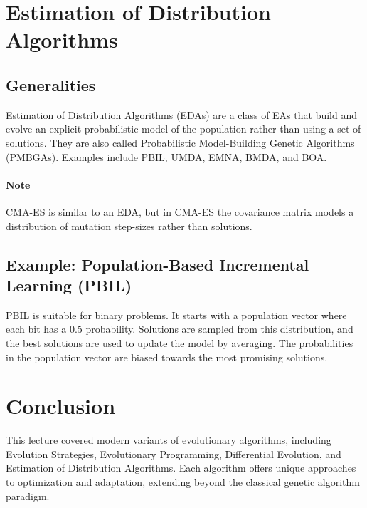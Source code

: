 \section{Estimation of Distribution Algorithms}
\subsection*{Generalities}
Estimation of Distribution Algorithms (EDAs) are a class of EAs that build and evolve an explicit probabilistic model of the population rather than using a set of solutions. They are also called Probabilistic Model-Building Genetic Algorithms (PMBGAs). Examples include PBIL, UMDA, EMNA, BMDA, and BOA.
\paragraph*{Note} CMA-ES is similar to an EDA, but in CMA-ES the covariance matrix models a distribution of mutation step-sizes rather than solutions.

\subsection*{Example: Population-Based Incremental Learning (PBIL)}
PBIL is suitable for binary problems. It starts with a population vector where each bit has a 0.5 probability.  Solutions are sampled from this distribution, and the best solutions are used to update the model by averaging. The probabilities in the population vector are biased towards the most promising solutions.

\section{Conclusion}
This lecture covered modern variants of evolutionary algorithms, including Evolution Strategies, Evolutionary Programming, Differential Evolution, and Estimation of Distribution Algorithms. Each algorithm offers unique approaches to optimization and adaptation, extending beyond the classical genetic algorithm paradigm.


